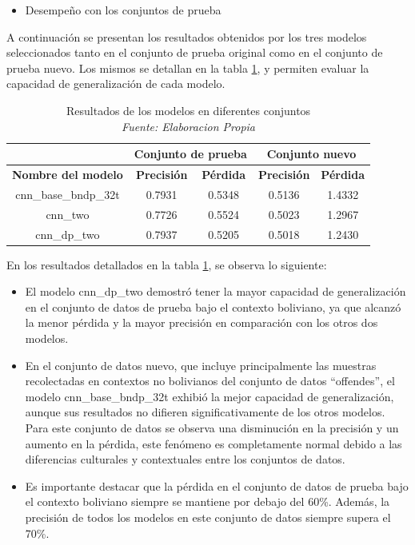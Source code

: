 \begin{itemize}
\item Desempeño con los conjuntos de prueba
\end{itemize}

A continuación se presentan los resultados obtenidos por los tres modelos seleccionados tanto en el conjunto de prueba original como en el conjunto de prueba nuevo. Los mismos se detallan en la tabla \ref{tbl:resultados}, y permiten evaluar la capacidad de generalización de cada modelo.


\begin{table}[!ht]
	\centering
	\begin{tabular}{|c|c|c|c|c|}
		\hline
		~ & \multicolumn{2}{|c|}{\textbf{Conjunto de prueba}} & \multicolumn{2}{|c|}{\textbf{Conjunto nuevo}} \\ \hline
		\textbf{Nombre del modelo} & \textbf{Precisión} & \textbf{Pérdida} & \textbf{Precisión} & \textbf{Pérdida} \\ \hline
		cnn\_base\_bndp\_32t & 0.7931 & 0.5348 & 0.5136 & 1.4332 \\ \hline
		cnn\_two & 0.7726 & 0.5524 & 0.5023 & 1.2967 \\ \hline
		cnn\_dp\_two & 0.7937 & 0.5205 & 0.5018 & 1.2430 \\ \hline
	\end{tabular}
	\caption{Resultados de los modelos en diferentes conjuntos
		\\\textit{Fuente: Elaboracion Propia}}
	\label{tbl:resultados}
\end{table}


En los resultados detallados en la tabla \ref{tbl:resultados}, se observa lo siguiente:

\begin{itemize}

\item El modelo cnn\_dp\_two demostró tener la mayor capacidad de generalización en el conjunto de datos de prueba bajo el contexto boliviano, ya que alcanzó la menor pérdida y la mayor precisión en comparación con los otros dos modelos.

\item En el conjunto de datos nuevo, que incluye principalmente las muestras recolectadas en contextos no bolivianos del conjunto de datos “offendes”, el modelo cnn\_base\_bndp\_32t exhibió la mejor capacidad de generalización, aunque sus resultados no difieren significativamente de los otros modelos. Para este conjunto de datos se observa una disminución en la precisión y un aumento en la pérdida, este fenómeno es completamente normal debido a las diferencias culturales y contextuales entre los conjuntos de datos.


\item Es importante destacar que la pérdida en el conjunto de datos de prueba bajo el contexto boliviano siempre se mantiene por debajo del 60\%. Además, la precisión de todos los modelos en este conjunto de datos siempre supera el 70\%.

\end{itemize}


